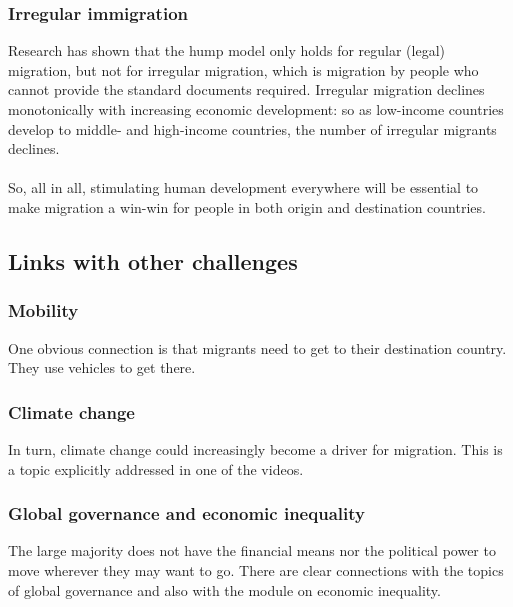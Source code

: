 \documentclass[../summary.tex]{subfiles}
\begin{document}
 	\subsubsection{Irregular immigration}
 	Research has shown that the hump model only holds for regular (legal) migration, but not for irregular migration, which is migration by people who cannot provide the standard documents required. Irregular migration declines monotonically with increasing economic development: so as low-income countries develop to middle- and high-income countries, the number of irregular migrants declines.
 	\\
 	\\
 	So, all in all, stimulating human development everywhere will be essential to make migration a win-win for people in both origin and destination countries.
 	
 	\subsection{Links with other challenges}
 	\subsubsection{Mobility}
 	One obvious connection is that migrants need to get to their destination country. They use vehicles to get there.
 	
 	\subsubsection{Climate change}
 	In turn, climate change could increasingly become a driver for migration. This is a topic explicitly addressed in one of the videos.
 	
 	\subsubsection{Global governance and economic inequality}
 	The large majority does not have the financial means nor the political power to move wherever they may want to go. There are clear connections with the topics of global governance and also with the module on economic inequality.
 	
	
	
	
	
	
	
	
	
	
	
	
	
	
	 
	
	
\end{document}
